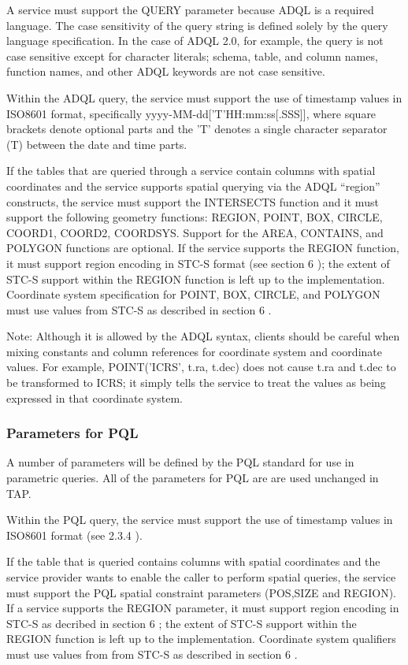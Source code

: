 \documentclass[11pt,a4paper]{ivoa}
\begin{document}
A service must support the QUERY parameter because ADQL is a required language.  
The case sensitivity of the query string is defined solely by the query language 
specification. In the case of ADQL 2.0, for example, the query is not case 
sensitive except for character  literals; schema, table, and column names, 
function names, and other ADQL keywords are not case sensitive.

Within the ADQL query, the service must support the use of timestamp values in 
ISO8601 format, specifically yyyy-MM-dd['T'HH:mm:ss[.SSS]], where square 
brackets denote optional parts and the 'T' denotes a single character separator 
(T) between the date and time parts.

If the tables that are queried through a service contain columns with spatial 
coordinates and the service supports spatial querying via the ADQL “region” 
constructs, the service must support the INTERSECTS function and it must support 
the following geometry functions: REGION, POINT, BOX, CIRCLE, COORD1, COORD2, 
COORDSYS. Support for the AREA, CONTAINS, and POLYGON functions are optional. If 
the service supports the REGION function, it must support region encoding in 
STC-S format (see section 6 ); the extent of STC-S support within the REGION 
function is left up to the implementation. Coordinate system specification for 
POINT, BOX, CIRCLE, and POLYGON must use values from STC-S as described in 
section 6 .

Note: Although it is allowed by the ADQL syntax, clients should be careful when 
mixing constants and column references for coordinate system and coordinate 
values. For example, POINT('ICRS', t.ra, t.dec) does not cause t.ra and t.dec to 
be transformed to ICRS; it simply tells the service to treat the values  as 
being expressed in that coordinate system.

\subsubsection{Parameters for PQL}
A number of parameters will be defined by the PQL standard for use in parametric 
queries. All of the parameters for PQL are are used unchanged in TAP.

Within the PQL query, the service must support the use of timestamp values in 
ISO8601 format (see 2.3.4 ).

If the table that is queried contains columns with spatial coordinates and the 
service provider wants to enable the caller to perform spatial queries, the 
service must support the PQL spatial constraint parameters (POS,SIZE and 
REGION). If a service supports the REGION parameter, it  must support region 
encoding in STC-S as decribed in section 6 ; the extent of STC-S support within 
the REGION function is left up to the implementation. Coordinate system 
qualifiers must use values from from STC-S as described in section 6 .
\end{document}
